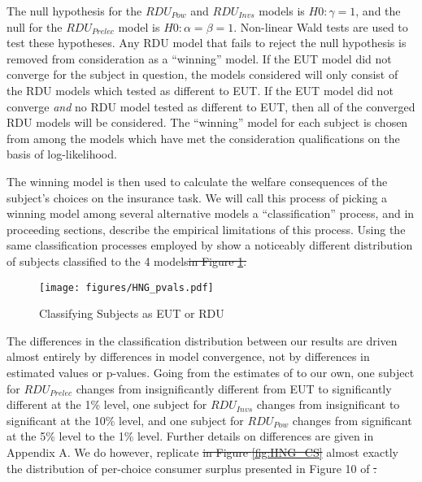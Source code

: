 \documentclass[../main.tex]{subfiles}
\providecommand{\DIFadd}[1]{{\protect\color{blue}\uwave{#1}}} %
\providecommand{\DIFdel}[1]{{\protect\color{red}\sout{#1}}}                      %
\providecommand{\DIFaddbegin}{} %
\providecommand{\DIFaddend}{} %
\providecommand{\DIFdelbegin}{} %
\providecommand{\DIFdelend}{} %
\providecommand{\DIFaddbeginFL}{} %
\providecommand{\DIFaddendFL}{} %
\providecommand{\DIFdelbeginFL}{} %
\providecommand{\DIFdelendFL}{} %
\begin{document}
The null hypothesis for the $\mathit{RDU_{Pow}}$ and $\mathit{RDU_{Invs}}$ models is $H0: \gamma = 1$, and the null for the $\mathit{RDU_{Prelec}}$ model is $H0: \alpha = \beta = 1$.
Non-linear Wald tests are used to test these hypotheses.
Any RDU model that fails to reject the null hypothesis is removed from consideration as a \enquote{winning} model.
If the EUT model did not converge for the subject in question, the models considered will only consist of the RDU models which tested as different to EUT.
If the EUT model did not converge \textit{and} no RDU model tested as different to EUT, then all of the converged RDU models will be considered.
The \enquote{winning} model for each subject is chosen from among the models which have met the consideration qualifications on the basis of log-likelihood.

The winning model is then used to calculate the welfare consequences of the subject's choices on the insurance task.
We will call this process of picking a winning model among several alternative models a \enquote{classification} process, and in proceeding sections, describe the empirical limitations of this process.
Using the same classification processes employed by \textcite{Harrison2016} show a noticeably different distribution of subjects classified to the 4 models\DIFdelbegin \DIFdel{in Figure \ref{fig:HNG_pvals}.
}\DIFdelend \DIFaddbegin \DIFadd{:
}\DIFaddend 

\begin{figure}[h!]
	\center
	\caption{Classifying Subjects as EUT or RDU}
	\DIFdelbeginFL %
\DIFdelendFL \DIFaddbeginFL \texttt{[image: figures/HNG\_pvals.pdf]}
	\DIFaddendFL \label{fig:HNG_pvals}
\end{figure}

The differences in the classification distribution between our results are driven almost entirely by differences in model convergence, not by differences in estimated values or p-values.
Going from the estimates of \textcite{Harrison2016} to our own, one subject for $\mathit{RDU_{Prelec}}$ changes from insignificantly different from EUT to significantly different at the 1\% level, one subject for $\mathit{RDU_{Invs}}$ changes from insignificant to significant at the 10\% level, and one subject for $\mathit{RDU_{Pow}}$ changes from significant at the 5\% level to the 1\% level.
Further details on differences are given in Appendix A.
We do however, replicate \DIFdelbegin \DIFdel{in Figure \ref{fig:HNG_CS} }\DIFdelend almost exactly the distribution of per-choice consumer surplus presented in Figure 10 of \textcite[108]{Harrison2016}\DIFdelbegin \DIFdel{.
}\DIFdelend \DIFaddbegin \DIFadd{:
}\DIFaddend 
\end{document}
